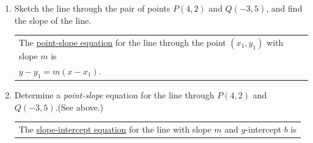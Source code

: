 \begin{enumerate}
\item Sketch the line through the pair of points $P(4,2)$ and $Q(-3,5 )$, and find the slope of the line. \\

\hspace{-.3in} \begin{tabular}{| l |}\hline
 \noindent The \underline{point-slope equation} for the line through the point $(x_1,y_1)$ with slope $m$ is \\

 $y-y_1 = m(x-x_1)$. \\ \hline
\end{tabular} 

\vspace{-.1in}
\item Determine a \emph{point-slope} equation for the line through $P(4,2)$ and $Q(-3,5)$.(See above.)\\[1in]






\hspace{-.3in} \begin{tabular}{| l |}\hline The \underline{slope-intercept equation} for the line with slope $m$ and $y$-intercept $b$ is \\


\end{tabular}
\end{enumerate}
